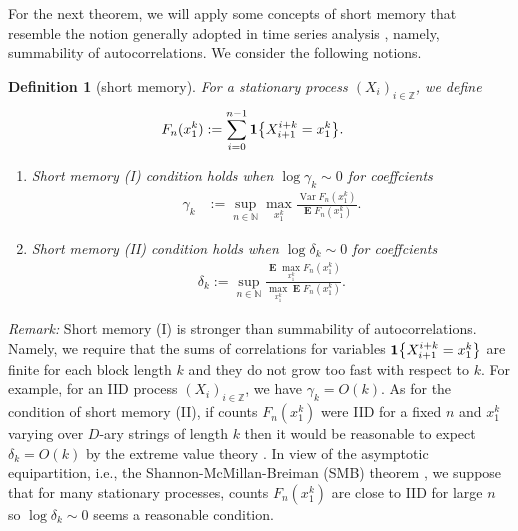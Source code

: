 \documentclass[a4paper,12pt]{article}
\newcommand{\klam}[1]{\left\{ #1 \right\}}
\DeclareMathOperator{\var}{Var}
\DeclareMathOperator{\mean}{\mathbf{E}}
\newcommand{\boole}[1]{{\bf 1}{\klam{#1}}}
\newtheorem{definition}{Definition}
\begin{document}
For the next theorem, we will apply some concepts of short memory that
resemble the notion generally adopted in time series analysis
\cite{Beran94}, namely, summability of autocorrelations.  
We consider the following notions.
\begin{definition}[short memory] For a stationary process
  $(X_i)_{i\in\mathbb{Z}}$, we define 
\begin{align}
  F_n(x_1^k)&:=\sum_{i=0}^{n-1}\boole{X_{i+1}^{i+k}=x_1^k}.
\end{align}
\begin{enumerate}
\item Short memory (I) condition holds when $\log \gamma_k\sim 0$ for
  coeffcients
    \begin{align}
      \label{Gamma}
      \gamma_k&:=\sup_{n\in\mathbb{N}}\max_{x_1^k}
                \frac{\var F_n(x_1^k)}{\mean F_n(x_1^k)}.
    \end{align}
  \item Short memory (II) condition holds when $\log \delta_k\sim 0$
    for coeffcients
    \begin{align}
    \label{Delta}
      \delta_k:=
      \sup_{n\in\mathbb{N}}\frac{\mean\max_{x_1^k}
      F_n(x_1^k)}{\max_{x_1^k}\mean F_n(x_1^k)}.
    \end{align}
  \end{enumerate}
\end{definition}
\emph{Remark:} Short memory (I) is stronger than summability of
autocorrelations.  Namely, we require that the sums of correlations
for variables $\boole{X_{i+1}^{i+k}=x_1^k}$ are finite for each block
length $k$ and they do not grow too fast with respect to $k$.  For
example, for an IID process $(X_i)_{i\in\mathbb{Z}}$, we have
$\gamma_k=O(k)$. As for the condition of short memory (II), if counts
$F_n(x_1^k)$ were IID for a fixed $n$ and $x_1^k$ varying over $D$-ary
strings of length $k$ then it would be reasonable to expect
$\delta_k=O(k)$ by the extreme value theory \citep{HaanFereira06}.  In
view of the asymptotic equipartition, i.e., the
Shannon-McMillan-Breiman (SMB) theorem \citep{Shannon48, Breiman57,
  Chung61, Barron85, AlgoetCover88}, we suppose that for many
stationary processes, counts $F_n(x_1^k)$ are close to IID for large
$n$ so $\log \delta_k\sim 0$ seems a reasonable condition.
\end{document}
